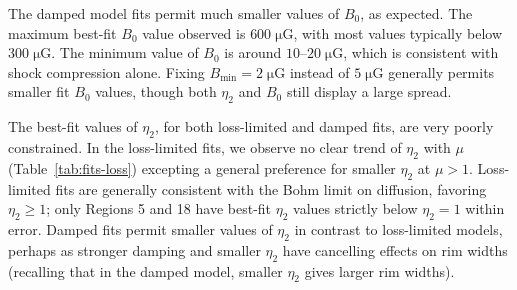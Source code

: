 \documentclass[iop, apj, numberedappendix]{emulateapj}
\newcommand*{\mt}{\mathrm}
\newcommand*{\unit}[1]{\;\mt{#1}}  %
\newcommand*{\Ecut}{E_{\mt{cut}}}
\newcommand*{\Bmin}{B_{\mt{min}}}
\newcommand*{\muG}{\unit{\mu G}}
\begin{document}
The damped model fits permit much smaller values of $B_0$, as expected.
The maximum best-fit $B_0$ value observed is $600 \muG$, with most values
typically below $300 \muG$.  The minimum value of $B_0$ is around $10$--$20
\muG$, which is consistent with shock compression alone.
Fixing $\Bmin = 2 \muG$ instead of $5 \muG$ generally permits smaller
fit $B_0$ values, though both $\eta_2$ and $B_0$ still display a large spread.




The best-fit values of $\eta_2$, for both loss-limited and damped fits,
are very poorly constrained.  In the loss-limited fits, we observe no clear
trend of $\eta_2$ with $\mu$ (Table~\ref{tab:fits-loss}) excepting a general
preference for smaller $\eta_2$ at $\mu > 1$.  Loss-limited fits are generally
consistent with the Bohm limit on diffusion, favoring $\eta_2 \geq 1$; only
Regions 5 and 18 have best-fit $\eta_2$ values strictly below $\eta_2 = 1$
within error.  Damped fits permit smaller values of $\eta_2$ in contrast to
loss-limited models, perhaps as stronger damping and smaller $\eta_2$ have
cancelling effects on rim widths (recalling that in the damped model, smaller
$\eta_2$ gives larger rim widths).
\end{document}
